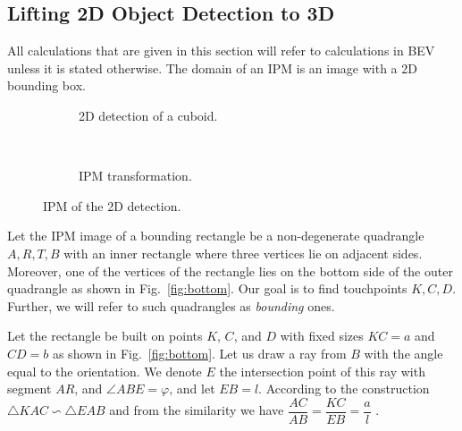 \documentclass[graybox]{svmult}
\begin{document}

\subsection{Lifting 2D Object Detection to 3D} \label{sec:comp}
All calculations that are given in this section will refer to calculations in BEV unless it is stated otherwise. The domain of an IPM is an image with a 2D bounding box.\\

\begin{figure}[h]
    \centering
    \begin{subfigure}[t]{0.5\textwidth}
        \centering
            \resizebox{.9\textwidth}{!}{%
                 \usebox{\cube}
            }
        \caption{2D detection of a cuboid.}
    \end{subfigure}%
    ~ 
    \begin{subfigure}[t]{0.5\textwidth}
 
         \resizebox{.6\textwidth}{!}{%
            \usebox{\icube}
            }
         \caption{IPM transformation.}
    \end{subfigure}
    \caption{IPM of the 2D detection.}
    \label{fig:ipm_cube}
\end{figure}


Let the $\mathrm{IPM}$ image of a bounding rectangle  be a non-degenerate quadrangle $A, R, T, B$ with an inner rectangle where three vertices lie on adjacent sides. Moreover, one of the vertices of the rectangle lies on the bottom side of the outer quadrangle as shown in Fig.~\ref{fig:bottom}. Our goal is to find touchpoints $K, C, D$. Further, we will refer to such quadrangles as \emph{bounding} ones.

Let the rectangle be built on points $K$, $C$, and $D$ with fixed sizes $KC = a$ and $CD = b$ as shown in Fig.~\ref{fig:bottom}.
Let us draw a ray from $B$ with the angle equal to the orientation. We denote $E$ the intersection point of this ray with segment $AR$,  and $\angle ABE = \varphi$, and let $EB = l$. According to the construction  \; $\triangle K A C \backsim  \triangle E A B$ \; and 
from the similarity we have 
$\dfrac{AC}{AB} = \dfrac{KC}{EB} = \dfrac{a}{l}$ .
\end{document}
